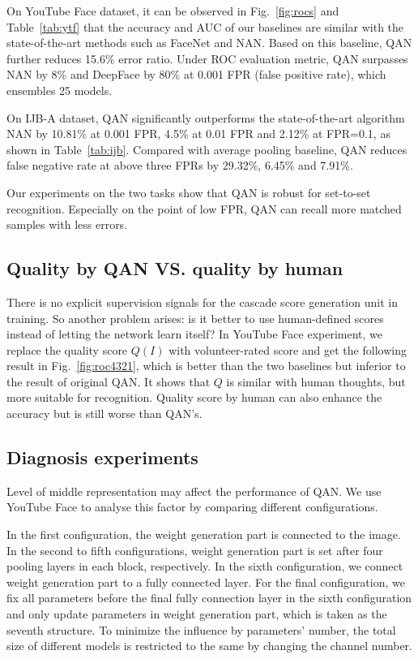 \documentclass[10pt,twocolumn,letterpaper]{article}
\begin{document}
On YouTube Face dataset, it can be observed in Fig.~\ref{fig:rocs} and Table~\ref{tab:ytf} that the accuracy and AUC of our baselines are similar with the state-of-the-art methods such as FaceNet and NAN. Based on this baseline, QAN further reduces 15.6\% error ratio. Under ROC evaluation metric, QAN surpasses NAN by 8\% and DeepFace by 80\% at 0.001 FPR (false positive rate), which ensembles 25 models.

On IJB-A dataset, QAN significantly outperforms the state-of-the-art algorithm NAN by 10.81\% at 0.001 FPR, 4.5\% at 0.01 FPR and 2.12\% at FPR=0.1, as shown in Table~\ref{tab:ijb}. Compared with average pooling baseline, QAN reduces false negative rate at above three FPRs by 29.32\%, 6.45\% and 7.91\%.

Our experiments on the two tasks show that QAN is robust for set-to-set recognition. Especially on the point of low FPR, QAN can recall more matched samples with less errors.












\subsection{ Quality by QAN VS. quality by human}
\label{sec:humanscorebetter}
There is no explicit supervision signals for the cascade score generation unit in training. So another problem arises: is it better to use human-defined scores instead of letting the network learn itself? In YouTube Face experiment, we replace the quality score $Q(I)$ with volunteer-rated score and get the following result in Fig.~\ref{fig:roc4321}, which is better than the two baselines but inferior to the result of original QAN. It shows that $Q$ is similar with human thoughts, but more suitable for recognition. Quality score by human can also enhance the accuracy but is still worse than QAN's.



\subsection{Diagnosis experiments}
Level of middle representation may affect the performance of QAN. We use YouTube Face to analyse this factor by comparing different configurations.




In the first configuration, the weight generation part is connected to the image. In the second to fifth configurations, weight generation part is set after four pooling layers in each block, respectively. In the sixth configuration, we connect weight generation part to a fully connected layer. For the final configuration, we fix all parameters before the final fully connection layer in the sixth configuration and only update parameters in weight generation part, which is taken as the seventh structure. To minimize the influence by parameters' number, the total size of different models is restricted to the same by changing the channel number. 
\end{document}
